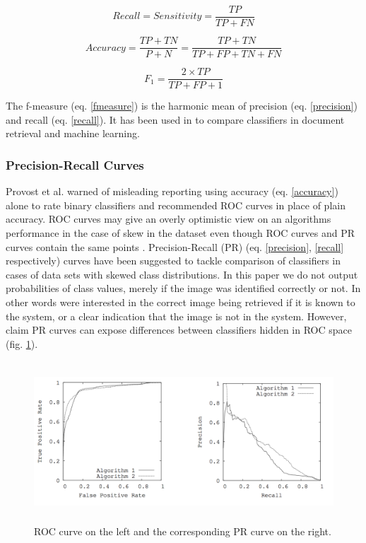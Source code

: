 \documentclass[english,12pt,a4paper,pdftex,elec,utf8, table]{aaltothesis}
\begin{document}
\begin{equation}\label{recall}
Recall = Sensitivity = \frac{TP}{TP + FN}
\end{equation}

\begin{equation}\label{accuracy}
Accuracy = \frac{TP + TN}{P + N} = \frac{TP +TN}{TP + FP + TN + FN}
\end{equation}

\begin{equation}\label{fmeasure}
F_1 = \frac{2 \times TP}{TP + FP + 1}
\end{equation}

The f-measure (eq. \ref{fmeasure}) is the harmonic mean of precision (eq. \ref{precision}) and recall (eq. \ref{recall}). It has been used in to compare classifiers in document retrieval and machine learning.

\subsubsection{Precision-Recall Curves}\label{PRSection}
Provost et al. warned of misleading reporting using accuracy (eq. \ref{accuracy}) alone to rate binary classifiers \cite{Provost1997} and recommended ROC curves in place of plain accuracy. ROC curves may give an overly optimistic view on an algorithms performance in the case of skew in the dataset even though ROC curves and PR curves contain the same points \cite{Davis2006}. Precision-Recall (PR) (eq. \ref{precision}, \ref{recall} respectively) curves have been suggested \cite{craven2005markov} to tackle comparison of classifiers in cases of data sets with skewed class distributions. In this paper we do not output probabilities of class values, merely if the image was identified correctly or not. In other words were interested in the correct image being retrieved if it is known to the system, or a clear indication that the image is not in the system. However, \cite{Davis2006} claim PR curves can expose differences between classifiers hidden in ROC space (fig. \ref{rocpr}).

\begin{figure}[htb]
\begin{center}
\includegraphics[height=6cm]{figures/rocpr}
\end{center}
\caption{ROC curve on the left and the corresponding PR curve on the right. \cite{Davis2006}}
\label{rocpr}
\end{figure}
\end{document}
